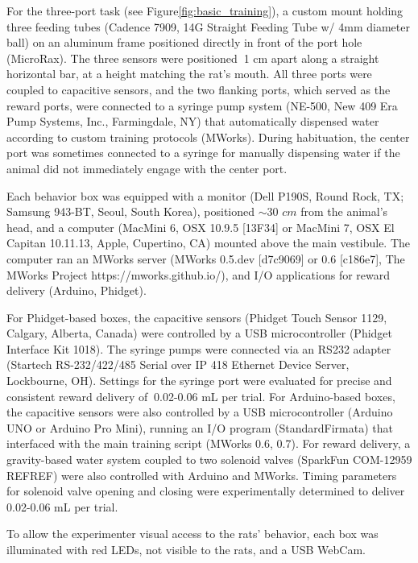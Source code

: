 For the three-port task (see Figure\ref{fig:basic_training}), a custom mount holding three feeding tubes (Cadence 7909, 14G Straight Feeding Tube w/ 4mm diameter ball) on an aluminum frame positioned directly in front of the port hole (MicroRax). The three sensors were positioned $~$1 cm apart along a straight horizontal bar, at a height matching the rat's mouth. All three ports were coupled to capacitive sensors, and the two flanking ports, which served as the reward ports, were connected to a syringe pump system (NE-500, New
409 Era Pump Systems, Inc., Farmingdale, NY) that automatically dispensed water according to custom training protocols (MWorks). During habituation, the center port was sometimes connected to a syringe for manually dispensing water if the animal did not immediately engage with the center port. 

Each behavior box was equipped with a monitor (Dell P190S,
Round Rock, TX; Samsung 943-BT, Seoul, South Korea), positioned $\sim$30 $cm$ from the animal's head, and a computer (MacMini 6, OSX 10.9.5 [13F34] or MacMini 7, OSX El Capitan 10.11.13, Apple, Cupertino, CA) mounted above the main vestibule. The computer ran an MWorks server (MWorks 0.5.dev [d7c9069] or 0.6 [c186e7], The MWorks Project https://mworks.github.io/), and I/O applications for reward delivery (Arduino\textregistered, Phidget). 

For Phidget-based boxes, the capacitive sensors (Phidget Touch Sensor 1129, Calgary, Alberta, Canada) were controlled by a USB microcontroller (Phidget Interface Kit 1018). The syringe pumps were connected via an RS232 adapter (Startech RS-232/422/485 Serial over IP
418 Ethernet Device Server, Lockbourne, OH). Settings for the syringe port were evaluated for precise and consistent reward delivery of $~$0.02-0.06 mL per trial. For Arduino-based boxes, the capacitive sensors were also controlled by a USB microcontroller (Arduino UNO or Arduino Pro Mini), running an I/O program (StandardFirmata) that interfaced with the main training script (MWorks 0.6, 0.7). For reward delivery, a gravity-based water system coupled to two solenoid valves (SparkFun COM-12959 REFREF) were also controlled with Arduino and MWorks. Timing parameters for solenoid valve opening and closing were experimentally determined to deliver $~$0.02-0.06 mL per trial.  

To allow the experimenter visual access to the rats' behavior, each box was illuminated with red LEDs, not visible to the rats, and a USB WebCam. 

